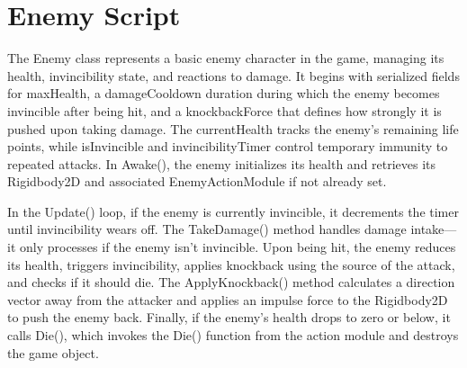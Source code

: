 \documentclass[12pt,oneside,openright,a4paper]{cpe-english-project}
\begin{document}
\section{Enemy Script}
The Enemy class represents a basic enemy character in the game, managing its health, invincibility state, and reactions to damage. It begins with serialized fields for maxHealth, a damageCooldown duration during which the enemy becomes invincible after being hit, and a knockbackForce that defines how strongly it is pushed upon taking damage. The currentHealth tracks the enemy's remaining life points, while isInvincible and invincibilityTimer control temporary immunity to repeated attacks. In Awake(), the enemy initializes its health and retrieves its Rigidbody2D and associated EnemyActionModule if not already set.\par
In the Update() loop, if the enemy is currently invincible, it decrements the timer until invincibility wears off. The TakeDamage() method handles damage intake—it only processes if the enemy isn't invincible. Upon being hit, the enemy reduces its health, triggers invincibility, applies knockback using the source of the attack, and checks if it should die. The ApplyKnockback() method calculates a direction vector away from the attacker and applies an impulse force to the Rigidbody2D to push the enemy back. Finally, if the enemy’s health drops to zero or below, it calls Die(), which invokes the Die() function from the action module and destroys the game object.\par
\newpage
\end{document}
